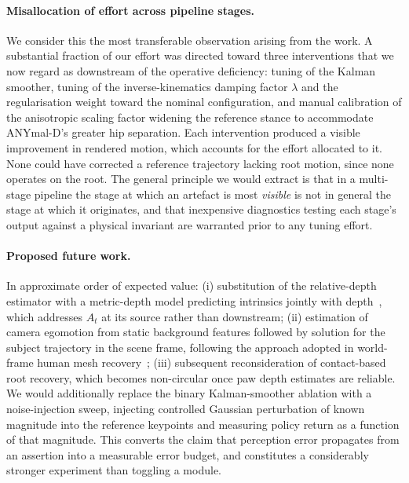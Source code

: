 \documentclass{article}
\theoremstyle{plain}
\theoremstyle{definition}
\theoremstyle{remark}
\begin{document}
\paragraph{Misallocation of effort across pipeline stages.} We consider this
the most transferable observation arising from the work. A substantial
fraction of our effort was directed toward three interventions that we now
regard as downstream of the operative deficiency: tuning of the Kalman
smoother, tuning of the inverse-kinematics damping factor $\lambda$ and the
regularisation weight toward the nominal configuration, and manual calibration
of the anisotropic scaling factor widening the reference stance to accommodate
ANYmal-D's greater hip separation. Each intervention produced a visible
improvement in rendered motion, which accounts for the effort allocated to it.
None could have corrected a reference trajectory lacking root motion, since
none operates on the root. The general principle we would extract is that in a
multi-stage pipeline the stage at which an artefact is most \emph{visible} is
not in general the stage at which it originates, and that inexpensive
diagnostics testing each stage's output against a physical invariant are
warranted prior to any tuning effort.
 
\paragraph{Proposed future work.} In approximate order of expected value:
(i) substitution of the relative-depth estimator with a metric-depth model
predicting intrinsics jointly with depth~\citep{piccinelli2024unidepth}, which
addresses $A_t$ at its source rather than downstream;
(ii) estimation of camera egomotion from static background features followed
by solution for the subject trajectory in the scene frame, following the
approach adopted in world-frame human mesh recovery~\citep{yuan2022glamr};
(iii) subsequent reconsideration of contact-based root recovery, which becomes
non-circular once paw depth estimates are reliable.
We would additionally replace the binary Kalman-smoother ablation with a
noise-injection sweep, injecting controlled Gaussian perturbation of known
magnitude into the reference keypoints and measuring policy return as a
function of that magnitude. This converts the claim that perception error
propagates from an assertion into a measurable error budget, and constitutes a
considerably stronger experiment than toggling a module.
 
\end{document}
